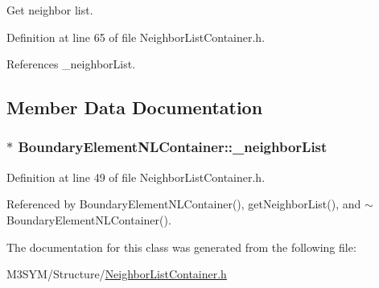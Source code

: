 Get neighbor list. 



Definition at line 65 of file Neighbor\+List\+Container.\+h.



References \+\_\+neighbor\+List.



\subsection{Member Data Documentation}
\hypertarget{classBoundaryElementNLContainer_ab75a418765e2601ec98e2159bab6ed84}{
\subsubsection[{\+\_\+neighbor\+List}]{$\ast$ Boundary\+Element\+N\+L\+Container\+::\+\_\+neighbor\+List\hspace{0.3cm}{\ttfamily [private]}}}\label{classBoundaryElementNLContainer_ab75a418765e2601ec98e2159bab6ed84}


Definition at line 49 of file Neighbor\+List\+Container.\+h.



Referenced by Boundary\+Element\+N\+L\+Container(), get\+Neighbor\+List(), and $\sim$\+Boundary\+Element\+N\+L\+Container().



The documentation for this class was generated from the following file\+:\begin{DoxyCompactItemize}
\item 
M3\+S\+Y\+M/\+Structure/\hyperlink{NeighborListContainer_8h}{Neighbor\+List\+Container.\+h}\end{DoxyCompactItemize}
